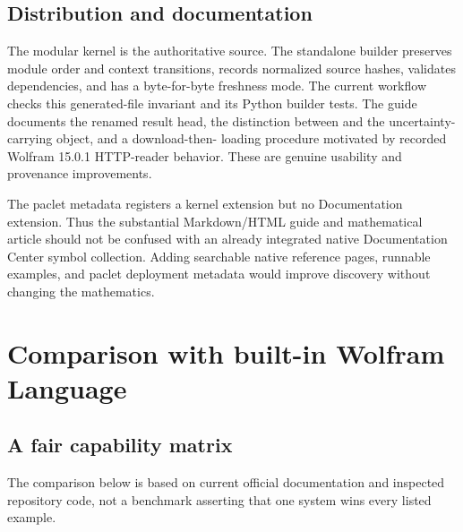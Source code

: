 \documentclass[11pt,a4paper]{article}
\newcommand{\code}[1]{\texttt{\detokenize{#1}}}
\begin{document}
\subsection{Distribution and documentation}

The modular kernel is the authoritative source. The standalone builder preserves module order and context transitions, records normalized source hashes, validates dependencies, and has a byte-for-byte freshness mode. The current workflow checks this generated-file invariant and its Python builder tests. The guide documents the renamed result head, the distinction between \code{Normal[s]} and the uncertainty-carrying object, and a download-then-\code{Get} loading procedure motivated by recorded Wolfram 15.0.1 HTTP-reader behavior. These are genuine usability and provenance improvements.\cite{development,workflow,guide}

The paclet metadata registers a kernel extension but no Documentation extension. Thus the substantial Markdown/HTML guide and mathematical article should not be confused with an already integrated native Documentation Center symbol collection. Adding searchable native reference pages, runnable examples, and paclet deployment metadata would improve discovery without changing the mathematics.\cite{paclet}

\section{Comparison with built-in Wolfram Language}\label{sec:comparison}

\subsection{A fair capability matrix}

The comparison below is based on current official documentation and inspected repository code, not a benchmark asserting that one system wins every listed example.\cite{wl-series,wl-seriesdata,wl-inverse,wl-compose,wl-solve,wl-asymptotic}
\end{document}
